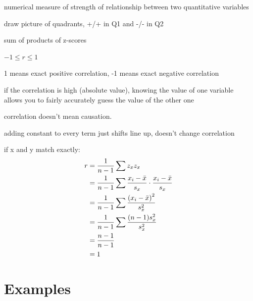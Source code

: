 \documentclass[landscape]{exam}
\begin{document}
  \begin{itemize*}
    \item numerical measure of strength of relationship between two quantitative
      variables

    \item draw picture of quadrants, +/+ in Q1 and -/- in Q2

    \item sum of products of z-scores

    \item $-1 \leq r \leq 1$

    \item 1 means exact positive correlation, -1 means exact negative
      correlation

    \item if the correlation is high (absolute value), knowing the value of
      one variable allows you to fairly accurately guess the value of the
      other one

    \item correlation doesn't mean causation.  

    \item adding constant to every term just shifts line up, doesn't change
      correlation

  \end{itemize*}

  if x and y match exactly:
  \begin{align*}
    r & = \frac{1}{n - 1} \sum z_x z_x \\
      & = \frac{1}{n - 1} \sum \frac{x_i - \bar{x}}{s_x} \cdot \frac{x_i - \bar{x}}{s_x} \\
      & = \frac{1}{n - 1} \sum \frac{\del{ x_i - \bar{x} }^2}{s_x^2} \\
      & = \frac{1}{n - 1} \sum \frac{(n - 1) s_x^2}{s_x^2} \\
      & = \frac{n - 1}{n - 1} \\
      & = 1 \\
  \end{align*}

  \section{Examples}
\end{document}
